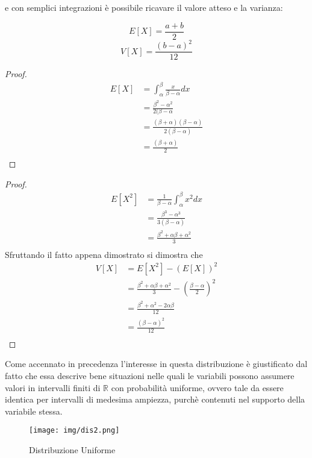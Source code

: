 \documentclass[a4paper,12pt, oneside]{book}
\newcommand{\numberset}{\mathbb}
\newcommand{\R}{\numberset{R}}
\begin{document}
e con semplici integrazioni è possibile ricavare il valore atteso e la varianza:
\begin{teo}
    \[E[X] = \frac{a+b}{2}\]
    \[V[X] = \frac{(b-a)^2}{12}\]
\end{teo}
\begin{proof}
    \[ \begin{split}
        E[X] & = \int _{\alpha}^{\beta} \frac{x}{\beta - \alpha} dx \\
             & = \frac{\beta^2 - \alpha^2}{2(\beta - \alpha} \\
             & = \frac{(\beta + \alpha)(\beta - \alpha)}{2(\beta - \alpha)}\\
             & = \frac{(\beta + \alpha)}{2}\\
        \end{split} \]
\end{proof}
\begin{proof}
    \[ \begin{split}
        E[X^2] & = \frac{1}{\beta - \alpha} \int _{\alpha}^{\beta} x^2 dx \\
               & = \frac{\beta^3 - \alpha^3}{3(\beta - \alpha)} \\
               & = \frac{\beta^2 + \alpha\beta + \alpha^2}{3}\\
        \end{split} \]
        Sfruttando il fatto appena dimostrato si dimostra che
    \[ \begin{split}
        V[X] & = E[X^2] - (E[X])^2 \\
             & = \frac{\beta^2 + \alpha\beta + \alpha^2}{3} - (\frac{\beta - \alpha}{2})^2\\
             & = \frac{\beta^2 + \alpha^2 - 2\alpha\beta}{12} \\
             & = \frac{(\beta - \alpha)^2}{12} \\
       \end{split} \]
\end{proof}

Come accennato in precedenza l'interesse in questa distribuzione è giustificato dal fatto che essa descrive bene
situazioni nelle quali le variabili possono assumere valori in intervalli finiti di $\R$ con probabilità uniforme,
ovvero tale da essere identica per intervalli di medesima ampiezza, purchè contenuti nel supporto della variabile stessa.
\begin{figure}
    \caption{Distribuzione Uniforme}
    \label{img:uniforme}
	\texttt{[image: img/dis2.png]}
\end{figure}
\end{document}

